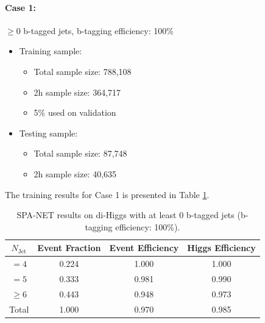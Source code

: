 \documentclass[12pt]{article}
\begin{document}
		\paragraph{Case 1:} $\ge 0$ b-tagged jets, b-tagging efficiency: 100\% 
		\begin{itemize}
			\item Training sample:
			\begin{itemize}
				\item Total sample size: 788,108
				\item 2h sample size: 364,717
				\item 5\% used on validation
			\end{itemize}
			\item Testing sample: 
				\begin{itemize}
					\item Total sample size: 87,748
					\item 2h sample size: 40,635
				\end{itemize}
		\end{itemize}
		The training results for Case 1 is presented in Table \ref{tab:SPANet_0btag_100}.
		\begin{table}[htpb]
			\centering
			\caption{SPA-NET results on di-Higgs with at least 0 b-tagged jets (b-tagging efficiency: 100\%).}
			\label{tab:SPANet_0btag_100}
			\begin{tabular}{c|c|cc}
				$N_\text{Jet}$ & Event Fraction & Event Efficiency & Higgs Efficiency \\
				\hline
				$=4$	  &   0.224             &    1.000              &    1.000             \\
				$=5$	  &   0.333             &    0.981              &    0.990             \\
				$\ge 6$	  &   0.443             &    0.948              &    0.973             \\
				Total	  &   1.000             &    0.970              &    0.985             \\
			\end{tabular}
		\end{table}
\end{document}
